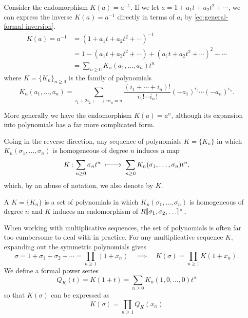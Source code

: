 \begin{example}
Consider the endomorphism $K(a)=a^{-1}$.
If we let $a=1+a_1t+a_2t^2+\cdots$, we can express the inverse $K(a)=a^{-1}$ directly in terms of $a_i$ by \cref{eq:general-formal-inversion}. 
\begin{equation}\label{eq:chern-inverse-non-symmetric}
	\begin{aligned}
		K(a)=a^{-1} & = (1+a_1t+a_2t^2+\cdots)^{-1}                              \\
		            & = 1-(a_1t+a_2t^2+\cdots) + (a_1t+a_2t^2+\cdots)^2 - \cdots \\
		            & = \sum_{n\geq 0} K_n(a_1,\ldots, a_n)t^n
	\end{aligned}
\end{equation}
where $K=\{K_n\}_{n\geq 0}$ is the family of polynomials
\begin{equation}\label{eq:inverse-K-series}
	K_n(a_1,\ldots, a_n) = \sum_{i_1+2i_2+\cdots+ ni_n=n}\frac{(i_1+\cdots+i_n)!}{i_1!\cdots i_n!}(-a_1)^{i_1}\cdots(-a_n)^{i_n}.
\end{equation}
\end{example}

\begin{example}
	More generally we have the endomorphism $K(a)=a^n$, although its expansion into polynomials has a far more complicated form.
\end{example}

Going in the reverse direction, any sequence of polynomials $K=\{K_n\}$ in which $K_n(\sigma_1,\ldots, \sigma_n)$ is homogeneous of degree $n$ induces a map
\begin{equation}\label{eq:multiplicative-sequence-endomorphism}
	K : \sum_{n\geq 0} \sigma_n t^n \lkxmapsto \sum_{n\geq 0} K_n(\sigma_1,\ldots, \sigma_n) t^n,
\end{equation}
which, by an abuse of notation, we also denote by $K$. 

\begin{definition}
	A  $K=\{K_n\}$ is a set of polynomials in which $K_n(\sigma_1,\ldots, \sigma_n)$ is homogeneous of degree $n$ and $K$ induces an endomorphism of $R[\![\sigma_1,\sigma_2,\ldots]\!]^\times$.
\end{definition}


When working with multiplicative sequences, the set of polynomials is often far too cumbersome to deal with in practice. For any multiplicative sequence $K$,
expanding out the symmetric polynomials gives
\[
	\sigma = 1+\sigma_1+\sigma_2+\cdots = \prod_{n\geq 1}(1+x_n)
	\quad\implies\quad
	K(\sigma) = \prod_{n\geq 1} K(1+x_n).
\]
We define a formal power series
\[
		Q_K(t) = K(1+t)=\sum_{n\geq 0}K_n(1,0,\ldots, 0) t^n
\]
so that $K(\sigma)$ can be expressed as
\[
		K(\sigma) = \prod_{n\geq 1}Q_K(x_n)
\]

